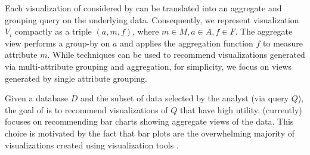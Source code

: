 Each visualization of considered by \SeeDB can be translated into an aggregate
and grouping query on the underlying data.
Consequently, we represent visualization $V_i$ compactly as a triple $(a, m, f)$, 
where $m \in M, a \in A, f \in F$. 
The aggregate view performs a group-by on $a$ and applies the aggregation function $f$ 
to measure attribute $m$. 
While \SeeDB techniques can be used to recommend visualizations
generated via multi-attribute grouping and aggregation,
for simplicity, we focus on views generated by single attribute grouping. 






Given a database $D$ and the subset of data selected by the analyst (via query $Q$), 
the goal of \SeeDB is to recommend visualizations of $Q$ that have high utility. 
\SeeDB (currently) focuses on recommending bar charts showing aggregate views of the 
data.
This choice is motivated by the fact that bar plots are the overwhelming
majority of visualizations created using visualization tools 
\cite{DBLP:journals/sigmod_record/MortonBGKM14}.
\fi





